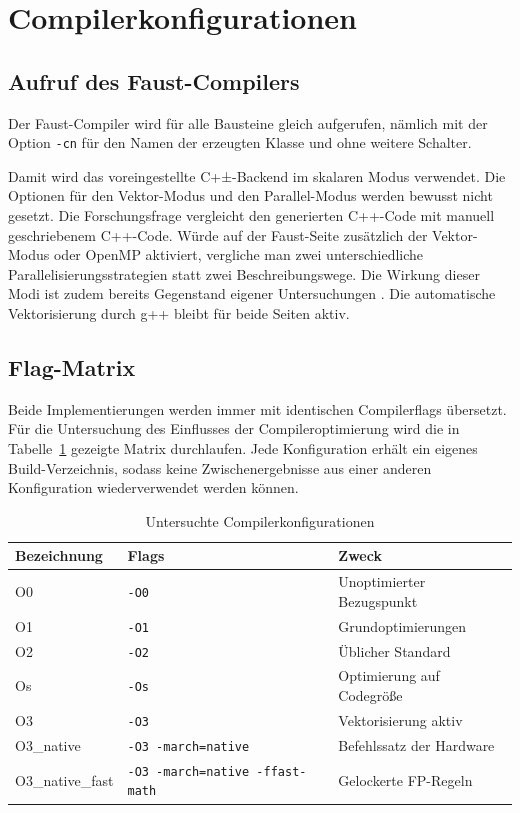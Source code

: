 \section{Compilerkonfigurationen}
\label{sec:compiler}

\subsection{Aufruf des Faust-Compilers}

Der Faust-Compiler wird für alle Bausteine gleich aufgerufen, nämlich mit der
Option \texttt{-cn} für den Namen der erzeugten Klasse und ohne weitere
Schalter.

Damit wird das voreingestellte C+±-Backend im skalaren Modus verwendet. Die
Optionen für den Vektor-Modus und den Parallel-Modus werden bewusst nicht
gesetzt. Die Forschungsfrage vergleicht den generierten C++-Code mit manuell
geschriebenem C++-Code. Würde auf der Faust-Seite zusätzlich der Vektor-Modus
oder OpenMP aktiviert, vergliche man zwei unterschiedliche
Parallelisierungsstrategien statt zwei Beschreibungswege. Die Wirkung dieser
Modi ist zudem bereits Gegenstand eigener Untersuchungen
\parencite{scaringella:hal-02158949, letz:hal-02158924}. Die automatische Vektorisierung durch
g++ bleibt für beide Seiten aktiv.

\subsection{Flag-Matrix}

Beide Implementierungen werden immer mit identischen Compilerflags übersetzt.
Für die Untersuchung des Einflusses der Compileroptimierung wird
die in Tabelle~\ref{tab:flags} gezeigte Matrix durchlaufen. Jede
Konfiguration erhält ein eigenes Build-Verzeichnis, sodass keine
Zwischenergebnisse aus einer anderen Konfiguration wiederverwendet werden können.

\begin{table}[htb]
	\centering
	\small
	\caption{Untersuchte Compilerkonfigurationen}
	\label{tab:flags}
	\begin{tabularx}{\textwidth}{@{} l l X @{}}
		\toprule
		\textbf{Bezeichnung} & \textbf{Flags} & \textbf{Zweck} \\
		\midrule
		O0             & \texttt{-O0}                           & Unoptimierter Bezugspunkt \\
		O1             & \texttt{-O1}                           & Grundoptimierungen \\
		O2             & \texttt{-O2}                           & Üblicher Standard \\
		Os             & \texttt{-Os}                           & Optimierung auf Codegröße \\
		O3             & \texttt{-O3}                           & Vektorisierung aktiv \\
		O3\_native     & \texttt{-O3 -march=native}             & Befehlssatz der Hardware \\
		O3\_native\_fast & \texttt{-O3 -march=native -ffast-math} & Gelockerte FP-Regeln \\
		\bottomrule
	\end{tabularx}
\end{table}

